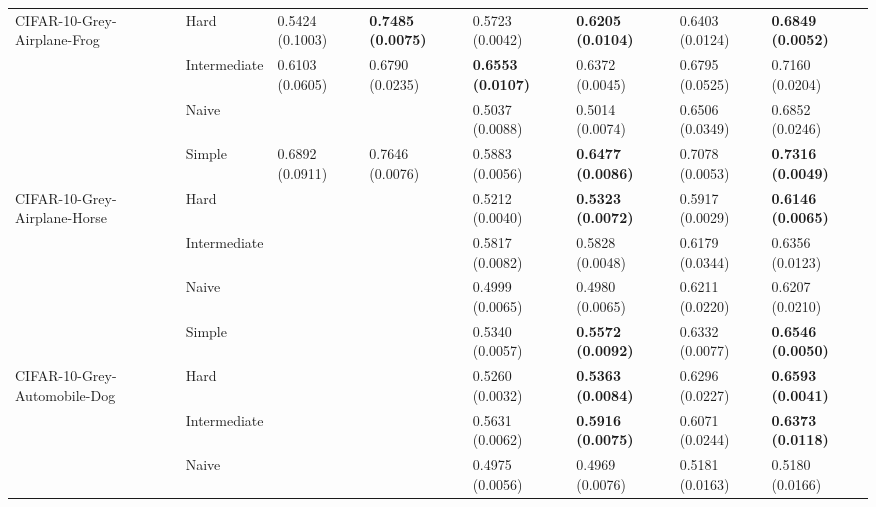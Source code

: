\begin{tabular}{llllllll}
CIFAR-10-Grey-Airplane-Frog & Hard &           0.5424 (0.1003) &  \textbf{0.7485 (0.0075)} &           0.5723 (0.0042) &  \textbf{0.6205 (0.0104)} &           0.6403 (0.0124) &  \textbf{0.6849 (0.0052)} \\
                 & Intermediate &           0.6103 (0.0605) &           0.6790 (0.0235) &  \textbf{0.6553 (0.0107)} &           0.6372 (0.0045) &           0.6795 (0.0525) &           0.7160 (0.0204) \\
                 & Naive &                           &                           &           0.5037 (0.0088) &           0.5014 (0.0074) &           0.6506 (0.0349) &           0.6852 (0.0246) \\
                 & Simple &           0.6892 (0.0911) &           0.7646 (0.0076) &           0.5883 (0.0056) &  \textbf{0.6477 (0.0086)} &           0.7078 (0.0053) &  \textbf{0.7316 (0.0049)} \\
CIFAR-10-Grey-Airplane-Horse & Hard &                           &                           &           0.5212 (0.0040) &  \textbf{0.5323 (0.0072)} &           0.5917 (0.0029) &  \textbf{0.6146 (0.0065)} \\
                 & Intermediate &                           &                           &           0.5817 (0.0082) &           0.5828 (0.0048) &           0.6179 (0.0344) &           0.6356 (0.0123) \\
                 & Naive &                           &                           &           0.4999 (0.0065) &           0.4980 (0.0065) &           0.6211 (0.0220) &           0.6207 (0.0210) \\
                 & Simple &                           &                           &           0.5340 (0.0057) &  \textbf{0.5572 (0.0092)} &           0.6332 (0.0077) &  \textbf{0.6546 (0.0050)} \\
CIFAR-10-Grey-Automobile-Dog & Hard &                           &                           &           0.5260 (0.0032) &  \textbf{0.5363 (0.0084)} &           0.6296 (0.0227) &  \textbf{0.6593 (0.0041)} \\
                 & Intermediate &                           &                           &           0.5631 (0.0062) &  \textbf{0.5916 (0.0075)} &           0.6071 (0.0244) &  \textbf{0.6373 (0.0118)} \\
                 & Naive &                           &                           &           0.4975 (0.0056) &           0.4969 (0.0076) &           0.5181 (0.0163) &           0.5180 (0.0166) \\

\end{tabular}
